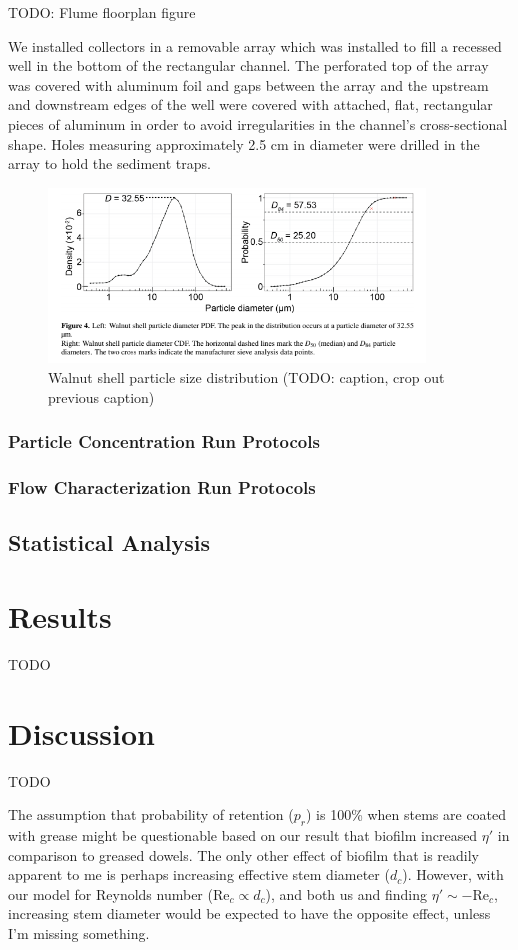 \documentclass[10pt,a4paper]{article}
\newcommand\Rey{\mathrm{Re}}
\begin{document}
TODO: Flume floorplan figure 

We installed collectors in a removable array which was installed to fill a recessed well in the bottom of the rectangular channel. The perforated top of the array was covered with aluminum foil and gaps between the array and the upstream and downstream edges of the well were covered with attached, flat, rectangular pieces of aluminum in order to avoid irregularities in the channel's cross-sectional shape. Holes measuring approximately 2.5 cm in diameter were drilled in the array to hold the sediment traps.

\begin{figure}[h]
\includegraphics[width=10cm]{wf5-200sizedist.png}
\centering
\caption{Walnut shell particle size distribution (TODO: caption, crop out previous caption)}
\end{figure}

\subsubsection{Particle Concentration Run Protocols}

\subsubsection{Flow Characterization Run Protocols}

\subsection{Statistical Analysis}

\section{Results}

TODO

\section{Discussion}

TODO

The assumption that probability of retention (\(p_r\)) is 100\% when stems are coated with grease might be questionable based on our result that biofilm increased \(\eta\prime\) in comparison to greased dowels. The only other effect of biofilm that is readily apparent to me is perhaps increasing effective stem diameter (\(d_c\)). However, with our model for Reynolds number (\(\Rey_c \propto d_c\)), and both us and \citet{Fauria_2015} finding \(\eta\prime \sim -\Rey_c\), increasing stem diameter would be expected to have the opposite effect, unless I'm missing something.



\end{document}
